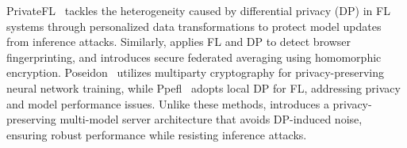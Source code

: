  PrivateFL~\cite{yang2023privatefl} tackles the heterogeneity caused by differential privacy (DP) in FL systems through personalized data transformations to protect model updates from inference attacks. Similarly, \cite{annamalai2023fp} applies FL and DP to detect browser fingerprinting, and \cite{dasu2022prov} introduces secure federated averaging using homomorphic encryption. Poseidon~\cite{sav2020poseidon} utilizes multiparty cryptography for privacy-preserving neural network training, while Ppefl~\cite{wang2023ppefl} adopts local DP for FL, addressing privacy and model performance issues. Unlike these methods, \Sys introduces a privacy-preserving multi-model server architecture that avoids DP-induced noise, ensuring robust performance while resisting inference attacks.
 










